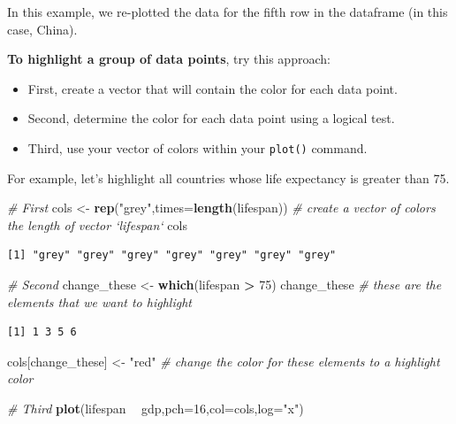 \documentclass[
]{book}
\newenvironment{Shaded}{\begin{snugshade}}{\end{snugshade}}
\newcommand{\CommentTok}[1]{\textcolor[rgb]{0.56,0.35,0.01}{\textit{#1}}}
\newcommand{\DataTypeTok}[1]{\textcolor[rgb]{0.13,0.29,0.53}{#1}}
\newcommand{\DecValTok}[1]{\textcolor[rgb]{0.00,0.00,0.81}{#1}}
\newcommand{\KeywordTok}[1]{\textcolor[rgb]{0.13,0.29,0.53}{\textbf{#1}}}
\newcommand{\NormalTok}[1]{#1}
\newcommand{\OperatorTok}[1]{\textcolor[rgb]{0.81,0.36,0.00}{\textbf{#1}}}
\newcommand{\StringTok}[1]{\textcolor[rgb]{0.31,0.60,0.02}{#1}}
\begin{document}
In this example, we re-plotted the data for the fifth row in the dataframe (in this case, China).

\textbf{To highlight a group of data points}, try this approach:

\begin{itemize}
\item
  First, create a vector that will contain the color for each data point.
\item
  Second, determine the color for each data point using a logical test.
\item
  Third, use your vector of colors within your \texttt{plot()} command.
\end{itemize}

For example, let's highlight all countries whose life expectancy is greater than 75.

\begin{Shaded}
\begin{Highlighting}[]
\CommentTok{# First}
\NormalTok{cols <-}\StringTok{ }\KeywordTok{rep}\NormalTok{(}\StringTok{"grey"}\NormalTok{,}\DataTypeTok{times=}\KeywordTok{length}\NormalTok{(lifespan)) }\CommentTok{# create a vector of colors the length of vector `lifespan`}
\NormalTok{cols}
\end{Highlighting}
\end{Shaded}

\begin{verbatim}
[1] "grey" "grey" "grey" "grey" "grey" "grey" "grey"
\end{verbatim}

\begin{Shaded}
\begin{Highlighting}[]
\CommentTok{# Second}
\NormalTok{change_these <-}\StringTok{ }\KeywordTok{which}\NormalTok{(lifespan }\OperatorTok{>}\StringTok{ }\DecValTok{75}\NormalTok{) }
\NormalTok{change_these }\CommentTok{# these are the elements that we want to highlight}
\end{Highlighting}
\end{Shaded}

\begin{verbatim}
[1] 1 3 5 6
\end{verbatim}

\begin{Shaded}
\begin{Highlighting}[]
\NormalTok{cols[change_these] <-}\StringTok{ "red"}  \CommentTok{# change the color for these elements to a highlight color}

\CommentTok{# Third}
\KeywordTok{plot}\NormalTok{(lifespan }\OperatorTok{~}\StringTok{ }\NormalTok{gdp,}\DataTypeTok{pch=}\DecValTok{16}\NormalTok{,}\DataTypeTok{col=}\NormalTok{cols,}\DataTypeTok{log=}\StringTok{"x"}\NormalTok{)}
\end{Highlighting}
\end{Shaded}
\end{document}
